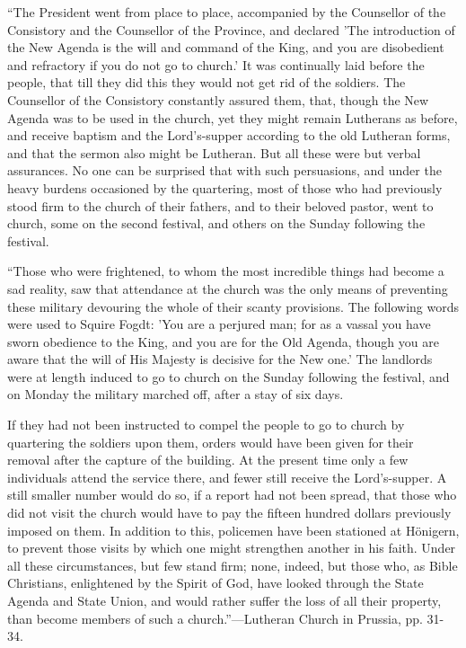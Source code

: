 ``The President went from place to
place, accompanied by the Counsellor of the Consistory and the
Counsellor of the Province, and declared 'The introduction of the New
Agenda is the will and command of the King, and you are disobedient and
refractory if you do not go to church.' It was continually laid before
the people, that till they did this they would not get rid of the
soldiers. The Counsellor of the Consistory constantly assured them,
that, though the New Agenda was to be used in the church, yet they might
remain Lutherans as before, and receive baptism and the Lord's-supper
according to the old Lutheran forms, and that the sermon also might be
Lutheran. But all these were but verbal assurances. No one can be
surprised that with such persuasions, and under the heavy burdens
occasioned by the quartering, most of those who had previously stood
firm to the church of their fathers, and to their beloved pastor, went to church, some on the second festival, and
others on the Sunday following the festival.

``Those who were frightened, to whom
the most incredible things had become a sad reality, saw that attendance
at the church was the only means of preventing these military devouring
the whole of their scanty provisions. The following words were used to
Squire Fogdt: 'You are a perjured man; for as a vassal you have sworn
obedience to the King, and you are for the Old Agenda, though you are
aware that the will of His Majesty is decisive for the New one.' The
landlords were at length induced to go to church on the Sunday following
the festival, and on Monday the military marched off, after a stay of
six days.

If they had not been instructed to
compel the people to go to church by quartering the soldiers upon them,
orders would have been given for their removal after the capture of the
building. At the present time only a few individuals attend the service
there, and fewer still receive the Lord's-supper. A still smaller number
would do so, if a report had not been spread, that those who did not
visit the church would have to pay the fifteen hundred dollars
previously imposed on them. In addition to this, policemen have been
stationed at Hönigern, to prevent those visits by which one might
strengthen another in his faith. Under all these circumstances, but few
stand firm; none, indeed, but those who, as Bible Christians,
enlightened by the Spirit of God, have looked through the State Agenda
and State Union, and would rather suffer the loss of all their property,
than become members of such a church.''—Lutheran Church in Prussia, pp.
31-34.

